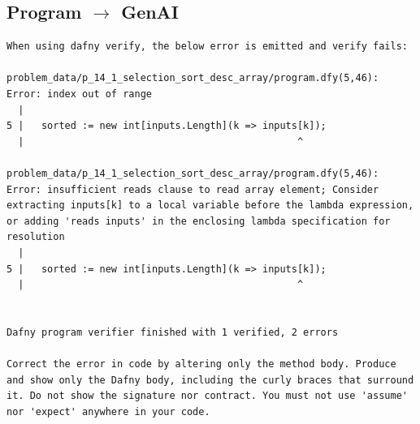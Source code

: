 \documentclass{article}
\begin{document}
\subsection*{Program $\rightarrow$ GenAI}
\begin{lstlisting}
When using dafny verify, the below error is emitted and verify fails:

problem_data/p_14_1_selection_sort_desc_array/program.dfy(5,46): Error: index out of range
  |
5 |   sorted := new int[inputs.Length](k => inputs[k]);
  |                                               ^

problem_data/p_14_1_selection_sort_desc_array/program.dfy(5,46): Error: insufficient reads clause to read array element; Consider extracting inputs[k] to a local variable before the lambda expression, or adding 'reads inputs' in the enclosing lambda specification for resolution
  |
5 |   sorted := new int[inputs.Length](k => inputs[k]);
  |                                               ^


Dafny program verifier finished with 1 verified, 2 errors

Correct the error in code by altering only the method body. Produce and show only the Dafny body, including the curly braces that surround it. Do not show the signature nor contract. You must not use 'assume' nor 'expect' anywhere in your code.
\end{lstlisting}
\end{document}

